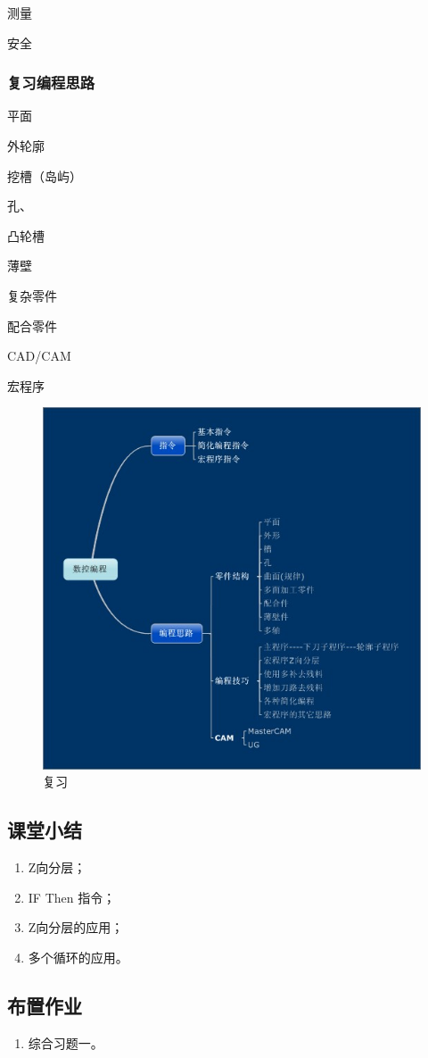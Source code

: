	测量

	安全

\subsubsection{复习编程思路}

	平面

	外轮廓

	挖槽（岛屿）

	孔、

	凸轮槽

	薄壁

	复杂零件

	配合零件

	CAD/CAM

	宏程序

\begin{figure}[h]
	\centering
	\includegraphics[width=0.9\linewidth,trim=0 0 0 0,clip]{data/image/35-1}
	\caption{复习}
	\label{fig:35-1}
\end{figure}

\subsection{课堂小结}
\begin{enumerate}[1、]
\item Z向分层；
\item IF Then 指令；
\item Z向分层的应用；
\item 多个循环的应用。
\end{enumerate}

\vfill
\subsection{布置作业}
\begin{enumerate}[1、]
	\item 综合习题一。
\end{enumerate}
\vfill